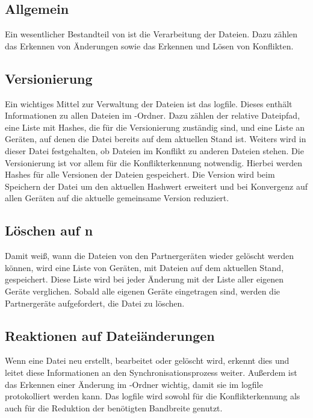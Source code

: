 \subsection{Allgemein}
Ein wesentlicher Bestandteil von \sblit ist die Verarbeitung der Dateien. Dazu zählen das Erkennen von Änderungen sowie das Erkennen und Lösen von Konflikten.

\subsection{Versionierung}\label{Logfile}
Ein wichtiges Mittel zur Verwaltung der Dateien ist das \gls{logfile}. Dieses enthält Informationen zu allen Dateien im \sblit-Ordner. Dazu zählen der relative Dateipfad, eine Liste mit Hashes, die für die Versionierung zuständig sind, und eine Liste an Geräten, auf denen die Datei bereits auf dem aktuellen Stand ist. Weiters wird in dieser Datei festgehalten, ob Dateien im Konflikt zu anderen Dateien stehen. Die Versionierung ist vor allem für die Konflikterkennung  notwendig. Hierbei werden Hashes für alle Versionen der Dateien gespeichert. Die Version wird beim Speichern der Datei um den aktuellen Hashwert erweitert und bei Konvergenz auf allen Geräten auf die aktuelle gemeinsame Version reduziert. 

\subsection{Löschen auf n}
Damit \sblit weiß, wann die Dateien von den Partnergeräten  wieder gelöscht werden können, wird eine Liste von Geräten, mit Dateien auf dem aktuellen Stand, gespeichert. Diese Liste wird bei jeder Änderung mit der Liste aller eigenen Geräte verglichen. Sobald alle eigenen Geräte eingetragen sind, werden die Partnergeräte aufgefordert, die Datei zu löschen. 

\subsection{Reaktionen auf Dateiänderungen}
Wenn eine Datei neu erstellt, bearbeitet oder gelöscht wird, erkennt dies \sblit und leitet diese Informationen an den Synchronisationsprozess weiter. Außerdem ist das Erkennen einer Änderung im \sblit-Ordner wichtig, damit sie im \gls{logfile} protokolliert werden kann. Das \gls{logfile} wird sowohl für die Konflikterkennung  als auch für die Reduktion der benötigten Bandbreite  genutzt.

